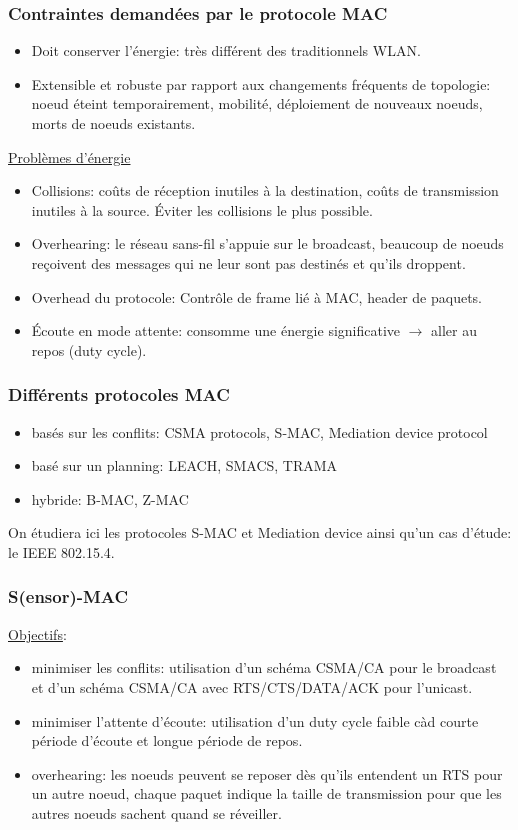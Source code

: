 \documentclass{article}
\begin{document}
\begin{sffamily}
\subsubsection{Contraintes demandées par le protocole MAC}
\begin{itemize}
\item Doit conserver l'énergie: très différent des traditionnels WLAN.
\item Extensible et robuste par rapport aux changements fréquents de topologie:
  noeud éteint temporairement, mobilité, déploiement de nouveaux noeuds,
  morts de noeuds existants.
\end{itemize}

\underline{Problèmes d'énergie}
\begin{itemize}
\item Collisions:
  coûts de réception inutiles à la destination,
  coûts de transmission inutiles à la source. Éviter les collisions
  le plus possible.
\item Overhearing:
  le réseau sans-fil s'appuie sur le broadcast, beaucoup de noeuds
  reçoivent des messages qui ne leur sont pas destinés et qu'ils droppent.
\item Overhead du protocole:
  Contrôle de frame lié à MAC, header de paquets.
\item Écoute en mode attente:
  consomme une énergie significative $\rightarrow$ aller au repos (duty cycle).
\end{itemize}

\subsubsection{Différents protocoles MAC}
\begin{itemize}
\item basés sur les conflits: CSMA protocols, S-MAC, Mediation device protocol
\item basé sur un planning: LEACH, SMACS, TRAMA
\item hybride: B-MAC, Z-MAC
\end{itemize}
On étudiera ici les protocoles S-MAC et Mediation device ainsi qu'un
cas d'étude: le IEEE 802.15.4.

\subsubsection{S(ensor)-MAC}
\underline{Objectifs}:
\begin{itemize}
\item minimiser les conflits:
  utilisation d'un schéma CSMA/CA pour le broadcast et d'un schéma CSMA/CA
  avec RTS/CTS/DATA/ACK pour l'unicast.
\item minimiser l'attente d'écoute:
  utilisation d'un duty cycle faible càd courte période d'écoute et longue
  période de repos.
\item overhearing: les noeuds peuvent se reposer dès qu'ils entendent un RTS
  pour un autre noeud, chaque paquet indique la taille de transmission pour
  que les autres noeuds sachent quand se réveiller.
\end{itemize}


\end{sffamily}
\end{document}
